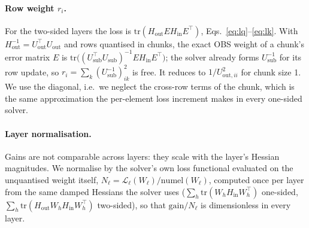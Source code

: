 \documentclass{article}
\newcommand{\gain}{\mathrm{gain}}
\newcommand{\tr}{\mathrm{tr}}
\newcommand{\Hin}{H_{\mathrm{in}}}
\newcommand{\Hout}{H_{\mathrm{out}}}
\begin{document}
\paragraph{Row weight $r_i$.} For the two-sided layers the loss is
$\tr(\Hout E \Hin E^\top)$, Eqs.~\eqref{eq:lq}--\eqref{eq:lk}. With
$\Hout^{-1} = U_{\mathrm{out}}^\top U_{\mathrm{out}}$ and rows quantised
in chunks, the exact OBS weight of a chunk's error matrix $E$ is
$\tr\big((U_{\mathrm{sub}}^\top U_{\mathrm{sub}})^{-1} E \Hin
E^\top\big)$; the solver already forms $U_{\mathrm{sub}}^{-1}$ for its row
update, so $r_i = \sum_k (U_{\mathrm{sub}}^{-1})_{ik}^2$ is free. It
reduces to $1/U_{\mathrm{out},ii}^2$ for chunk size 1. We use the
diagonal, i.e.\ we neglect the cross-row terms of the chunk, which is the
same approximation the per-element loss increment makes in every
one-sided solver.

\paragraph{Layer normalisation.} Gains are not comparable across layers:
they scale with the layer's Hessian magnitudes. We normalise by the
solver's own loss functional evaluated on the unquantised weight itself,
$N_\ell = \mathcal{L}_\ell(W_\ell)/\mathrm{numel}(W_\ell)$, computed once
per layer from the same damped Hessians the solver uses ($\sum_h
\tr(W_h\Hin W_h^\top)$ one-sided, $\sum_h \tr(\Hout W_h \Hin W_h^\top)$
two-sided), so that $\gain/N_\ell$ is dimensionless in every layer.
\end{document}
